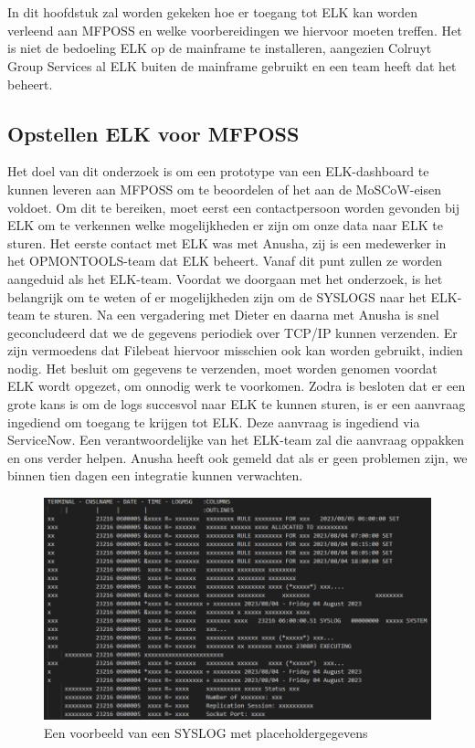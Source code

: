 \chapter{}%
\label{ch:Opstellen ELK}
In dit hoofdstuk zal worden gekeken hoe er toegang tot ELK kan worden verleend aan MFPOSS en welke voorbereidingen we hiervoor moeten treffen. Het is niet de bedoeling ELK op de mainframe te installeren, aangezien Colruyt Group Services al ELK buiten de mainframe gebruikt en een team heeft dat het beheert.

\section{Opstellen ELK voor MFPOSS}
Het doel van dit onderzoek is om een prototype van een ELK-dashboard te kunnen leveren aan MFPOSS om te beoordelen of het aan de MoSCoW-eisen voldoet. Om dit te bereiken, moet eerst een contactpersoon worden gevonden bij ELK om te verkennen welke mogelijkheden er zijn om onze data naar ELK te sturen. Het eerste contact met ELK was met Anusha, zij is een medewerker in het OPMONTOOLS-team dat ELK beheert. Vanaf dit punt zullen ze worden aangeduid als het ELK-team. Voordat we doorgaan met het onderzoek, is het belangrijk om te weten of er mogelijkheden zijn om de SYSLOGS naar het ELK-team te sturen. Na een vergadering met Dieter en daarna met Anusha is snel geconcludeerd dat we de gegevens periodiek over TCP/IP kunnen verzenden. Er zijn vermoedens dat Filebeat hiervoor misschien ook kan worden gebruikt, indien nodig. Het besluit om gegevens te verzenden, moet worden genomen voordat ELK wordt opgezet, om onnodig werk te voorkomen. Zodra is besloten dat er een grote kans is om de logs succesvol naar ELK te kunnen sturen, is er een aanvraag ingediend om toegang te krijgen tot ELK. Deze aanvraag is ingediend via ServiceNow. Een verantwoordelijke van het ELK-team zal die aanvraag oppakken en ons verder helpen. Anusha heeft ook gemeld dat als er geen problemen zijn, we binnen tien dagen een integratie kunnen verwachten.


\begin{figure}[h]
    \centering
    \includegraphics[width=1\linewidth]{bachproef/graphics/Voorbeeld_Syslog.png}
    \caption{Een voorbeeld van een SYSLOG met placeholdergegevens}
    \label{fig:Een voorbeeld van een SYSLOG met placeholdergegevens}
\end{figure}

